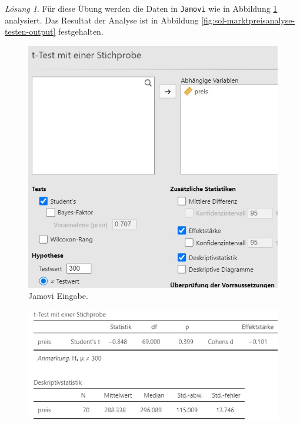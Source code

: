 \documentclass[
]{book}
\theoremstyle{definition}
\theoremstyle{definition}
\theoremstyle{definition}
\theoremstyle{definition}
\theoremstyle{remark}
\newtheorem*{solution}{Lösung}
\begin{document}
\begin{solution}

Für diese Übung werden die Daten in \texttt{Jamovi} wie in Abbildung \ref{fig:sol-marktpreisanalyse-testen-input} analysiert. Das Resultat der Analyse ist in Abbildung \ref{fig:sol-marktpreisanalyse-testen-output} festgehalten.

\begin{figure}

{\centering \includegraphics[width=1\linewidth]{figures/05-exr-marktpreisanalyse-testen-jmv-input} 

}

\caption{Jamovi Eingabe.}\label{fig:sol-marktpreisanalyse-testen-input}
\end{figure}

\begin{figure}

{\centering \includegraphics[width=1\linewidth]{figures/05-exr-marktpreisanalyse-testen-jmv-output} 

}
\end{figure}
\end{solution}
\end{document}
